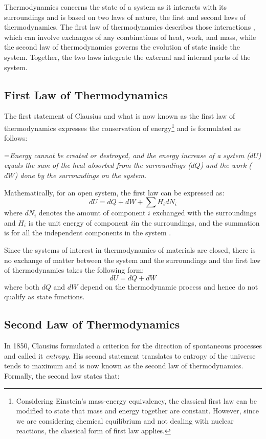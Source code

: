 	Thermodynamics concerns the state of a system as it interacts with its surroundings and is based on two laws of nature, the first and second laws of thermodynamics. The first law of thermodynamics describes those interactions , which can involve exchanges of any combinations of heat, work, and mass, while the second law of thermodynamics governs the evolution of state inside the system. Together, the two laws   integrate the external and internal parts of the system.
	
	\subsection{First Law of Thermodynamics}
	The first statement of Clausius and what is now known as the first law of thermodynamics expresses the conservation of energy\footnote{Considering Einstein's mass-energy equivalency, the classical first law can be modified to state that mass and energy together are constant. However, since we are considering chemical equilibrium and not dealing with nuclear reactions, the classical form of first law applies.} and is formulated as follows: 
	
		\hangindent=\parindent \emph{Energy cannot be created or destroyed, and the energy increase of a system ($dU$) equals the sum of the heat absorbed from the surroundings ($dQ$) and the work ($dW$) done by the surroundings on the system.}
		
	\noindent Mathematically, for an open system, the first law can be expressed as:
	\begin{equation}\label{eqn:flot}
		dU = dQ + dW + \sum H_i dN_i
	\end{equation}
	where $dN_i$ denotes the amount of component $i$ exchanged with the surroundings and $H_i$ is the unit energy of component $i$in the surroundings, and the summation is for all the independent components in the system . 
	
	Since the systems of interest in thermodynamics of materials are closed, there is no exchange of matter between the system and the surroundings and the first law of thermodynamics takes the following form:
	\begin{equation}\label{eqn:flot}
		dU = dQ + dW
	\end{equation}
	where both $dQ$ and $dW$ depend on the thermodynamic process and hence do not qualify as state functions.
	
	\subsection{Second Law of Thermodynamics}
	In 1850, Clausius formulated a criterion for the direction of spontaneous processes and called it \emph{entropy}. His second statement translates to entropy of the universe tends to maximum and is now known as the second law of thermodynamics. Formally, the second law states that:
	
